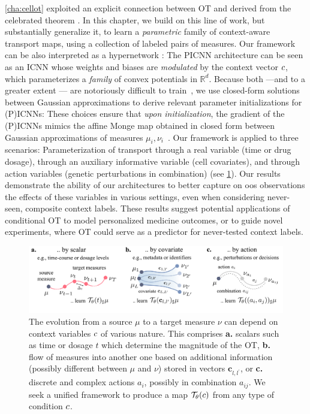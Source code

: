  \cref{cha:cellot} exploited an explicit connection between \acrshort{OT} and  derived from the celebrated \citeauthor{brenier1987decomposition} theorem \citeyearpar{brenier1987decomposition}.
In this chapter, we build on this line of work, but substantially generalize it, to learn a {\em parametric} family of context-aware transport maps, using a collection of labeled pairs of measures.
Our framework can be also interpreted as a hypernetwork \citep{ha2016hypernetworks}: The \acrshort{PICNN} architecture can be seen as an \acrshort{ICNN} whose weights and biases are \textit{modulated} by the context vector $c$, which parameterizes a \textit{family} of convex potentials in $\mathbb{R}^d$.
%
Because both  ---and to a greater extent --- are notoriously difficult to train~\citep{richter2021input,korotin2021wasserstein,korotin2021neural}, we use closed-form solutions between Gaussian approximations to derive relevant parameter initializations for (P)ICNNs:
These choices ensure that \textit{upon initialization}, the gradient of the (P)ICNNs mimics the affine Monge map obtained in closed form between Gaussian approximations of measures $\mu_i,\nu_i$~\citep{gelbrich1990formula}.
%
Our framework is applied to three scenarios: Parameterization of transport through a real variable (time or drug dosage), through an auxiliary informative variable (cell covariates), and through action variables (genetic perturbations in combination) (see \cref{fig:overview_condot}). Our results demonstrate the ability of our architectures to better capture on \acrlong{oos} observations the effects of these variables in various settings, even when considering never-seen, composite context labels. These results suggest potential applications of conditional \acrshort{OT} to model personalized medicine outcomes, or to guide novel experiments, where \acrshort{OT} could serve as a predictor for never-tested context labels.


\begin{figure}
    \centering
    \includegraphics[width= \textwidth]{figures/fig_overview_condot.pdf}
    \caption{The evolution from a source $\mu$ to a target measure $\nu$ can depend on context variables $c$ of various nature. This comprises \textbf{a.} scalars such as time or dosage $t$ which determine the magnitude of the \acrlong{OT}, \textbf{b.} flow of measures into another one based on additional information (possibly different between $\mu$ and $\nu$) stored in vectors $\mathbf{c}_{l,l^\prime}$, or \textbf{c.} discrete and complex actions $a_i$, possibly in combination $a_{ij}$. We seek a unified framework to produce a map $\mathcal{T}_\theta(c)$ from any type of condition $c$.}
    \label{fig:overview_condot}
\end{figure}



